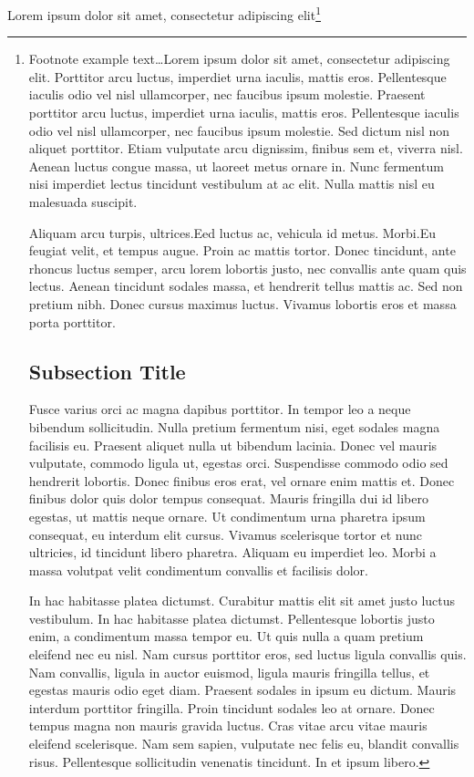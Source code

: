 Lorem ipsum dolor sit amet, consectetur adipiscing elit\footnote{Footnote example text\ldots Lorem ipsum dolor sit amet, consectetur adipiscing elit.
Porttitor arcu luctus, imperdiet urna iaculis, mattis eros.
Pellentesque iaculis odio vel nisl ullamcorper, nec faucibus ipsum molestie.
Praesent porttitor arcu luctus, imperdiet urna iaculis, mattis eros.
Pellentesque iaculis odio vel nisl ullamcorper, nec faucibus ipsum molestie.
Sed dictum nisl non aliquet porttitor.
Etiam vulputate arcu dignissim, finibus sem et, viverra nisl.
Aenean luctus congue massa, ut laoreet metus ornare in.
Nunc fermentum nisi imperdiet lectus tincidunt vestibulum at ac elit.
Nulla mattis nisl eu malesuada suscipit.

Aliquam arcu turpis, ultrices.Eed luctus ac, vehicula id metus.
Morbi.Eu feugiat velit, et tempus augue.
Proin ac mattis tortor.
Donec tincidunt, ante rhoncus luctus semper, arcu lorem lobortis justo, nec convallis ante quam quis lectus.
Aenean tincidunt sodales massa, et hendrerit tellus mattis ac.
Sed non pretium nibh.
Donec cursus maximus luctus.
Vivamus lobortis eros et massa porta porttitor.


\subsection{Subsection Title}

Fusce varius orci ac magna dapibus porttitor.
In tempor leo a neque bibendum sollicitudin.
Nulla pretium fermentum nisi, eget sodales magna facilisis eu.
Praesent aliquet nulla ut bibendum lacinia.
Donec vel mauris vulputate, commodo ligula ut, egestas orci.
Suspendisse commodo odio sed hendrerit lobortis.
Donec finibus eros erat, vel ornare enim mattis et.
Donec finibus dolor quis dolor tempus consequat.
Mauris fringilla dui id libero egestas, ut mattis neque ornare.
Ut condimentum urna pharetra ipsum consequat, eu interdum elit cursus.
Vivamus scelerisque tortor et nunc ultricies, id tincidunt libero pharetra.
Aliquam eu imperdiet leo.
Morbi a massa volutpat velit condimentum convallis et facilisis dolor.

In hac habitasse platea dictumst.
Curabitur mattis elit sit amet justo luctus vestibulum.
In hac habitasse platea dictumst.
Pellentesque lobortis justo enim, a condimentum massa tempor eu.
Ut quis nulla a quam pretium eleifend nec eu nisl.
Nam cursus porttitor eros, sed luctus ligula convallis quis.
Nam convallis, ligula in auctor euismod, ligula mauris fringilla tellus, et egestas mauris odio eget diam.
Praesent sodales in ipsum eu dictum.
Mauris interdum porttitor fringilla.
Proin tincidunt sodales leo at ornare.
Donec tempus magna non mauris gravida luctus.
Cras vitae arcu vitae mauris eleifend scelerisque.
Nam sem sapien, vulputate nec felis eu, blandit convallis risus.
Pellentesque sollicitudin venenatis tincidunt.
In et ipsum libero.


}
